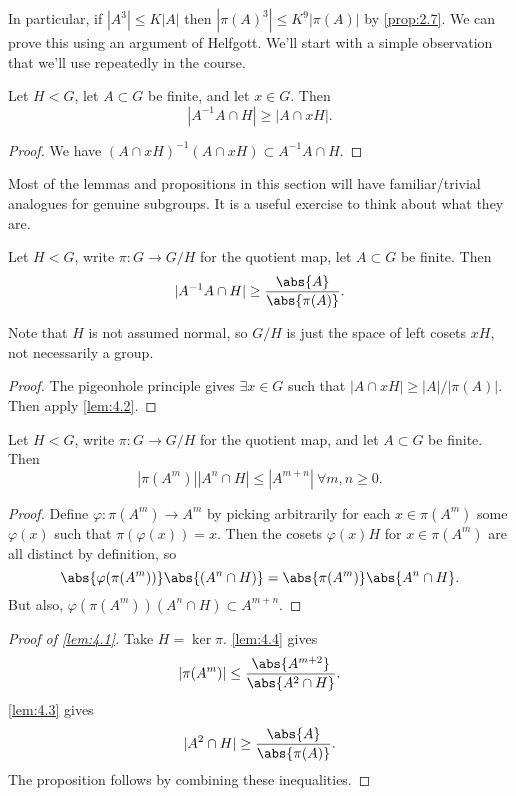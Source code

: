 \documentclass{article}
\newcommand{\ratio}[2]{\frac{\abs{#1}}{\abs{#2}}}
\numberwithin{equation}{section}
\begin{document}
In particular, if $|A^3| \leq K|A|$ then $|\pi(A)^3| \leq K^9 |\pi(A)|$ by \cref{prop:2.7}.
We can prove this using an argument of Helfgott.
We'll start with a simple observation that we'll use repeatedly in the course.
\begin{nlemma} \label{lem:4.2}
  Let $H < G$, let $A \subset G$ be finite, and let $x \in G$.
  Then
  \begin{equation*}|A^{-1} A \cap H| \geq |A \cap xH|.\end{equation*}
\end{nlemma}
\begin{proof}
  We have $(A \cap xH)^{-1} (A \cap xH) \subset A^{-1} A \cap H$.
\end{proof}
\begin{remark}
  Most of the lemmas and propositions in this section will have familiar/trivial analogues for genuine subgroups.
  It is a useful exercise to think about what they are.
\end{remark}
\begin{nlemma}\label{lem:4.3}
  Let $H < G$, write $\pi: G \to G/H$ for the quotient map, let $A \subset G$ be finite.
  Then
  \begin{equation*}|A^{-1} A \cap H| \geq \ratio{A}{\pi(A)}.\end{equation*}
\end{nlemma}
Note that $H$ is not assumed normal, so $G/H$ is just the space of left cosets $xH$, not necessarily a group.
\begin{proof}
  The pigeonhole principle gives $\exists x \in G$ such that $|A \cap xH| \geq |A|/|\pi(A)|$. Then apply \cref{lem:4.2}.
\end{proof}
\begin{nlemma}\label{lem:4.4}
  Let $H < G$, write $\pi:G \to G/H$ for the quotient map, and let $A \subset G$ be finite.
  Then
  \begin{equation*}|\pi(A^m)| |A^n \cap H| \leq |A^{m+n}| \ \forall m,n \geq 0.\end{equation*}
\end{nlemma}
\begin{proof}
  Define $\varphi: \pi(A^m) \to A^m$ by picking arbitrarily for each $x \in \pi(A^m)$ some $\varphi(x)$ such that $\pi(\varphi(x))= x$.
  Then the cosets $\varphi(x)H$ for $x \in \pi(A^m)$ are all distinct by definition, so
  \begin{equation*}
    \abs{\varphi(\pi(A^m))}\abs{(A^n \cap H)} = \abs{\pi(A^m)}\abs{A^n \cap H}.
  \end{equation*}
  But also, $\varphi(\pi(A^m))(A^n \cap H) \subset A^{m+n}$.
\end{proof}
\begin{proof}[Proof of \cref{lem:4.1}]
  Take $H = \ker \pi$.
  \cref{lem:4.4} gives
  \begin{equation*}|\pi(A^m)| \leq \frac{\abs{A^{m+2}}}{\abs{A^2 \cap H}}.\end{equation*}
  \cref{lem:4.3} gives
  \begin{equation*}|A^2 \cap H| \geq \ratio{A}{\pi(A)}.\end{equation*}
  The proposition follows by combining these inequalities.
\end{proof}
\end{document}
